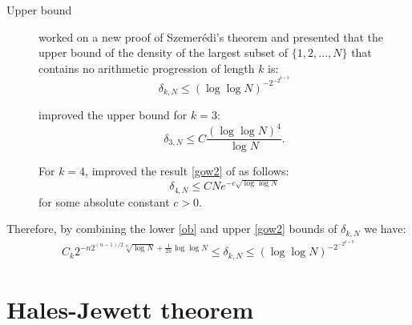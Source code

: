 \begin{description}
\item[Upper bound]
\cite{gowers2001new} worked on a new proof of Szemerédi's theorem and presented  that the upper bound of the density of the largest subset of $\{1,2, \ldots, N\}$ that contains no arithmetic progression of length $k$ is:
\begin{equation}
\delta_{k,N} \leq  \left(\log \log N\right)^{-2^{-2^{k+9}}} \label{gow2}
\end{equation}


\cite{bloom2016quantitative} improved the upper bound for $k=3:$
\begin{equation}
\delta_{3,N} \leq C \frac{(\log \log N)^4}{\log N} . \label{r32}
\end{equation}

For $k=4$, \cite{green2006new} improved the result \eqref{gow2} of \cite{gowers2001new} as follows:
\begin{equation}
\delta_{4,N} \leq C N e^{-c\sqrt{\log \log N}} \label{r4}
\end{equation}
for some absolute constant $c > 0.$
\end{description}

Therefore, by combining the lower \eqref{ob}  and upper \eqref{gow2}  bounds of $\delta_{k,N}$ we have:
\begin{align}
C_k 2^{-n2^{(n-1)/2} \sqrt[n]{\log N} +\frac{1}{2n} \log \log N } \leq \delta_{k,N} \leq \left(\log \log N\right)^{-2^{-2^{k+9}}}
\end{align}


\section{Hales-Jewett theorem } \label{hjt}

